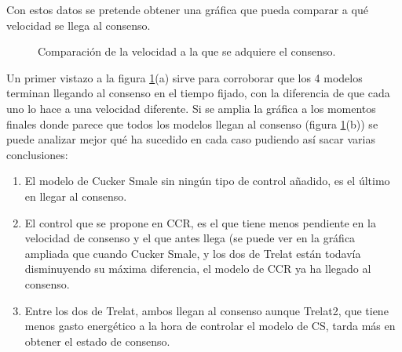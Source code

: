 Con estos datos se pretende obtener una gráfica que pueda comparar a qué velocidad se llega al consenso.

\begin{figure}[htbp]
\centering
\caption{Comparación de la velocidad a la que se adquiere el consenso.} 
\label{fig:consenso_4models}
\end{figure}

Un primer vistazo a la figura \ref{fig:consenso_4models}(a) sirve para corroborar que los 4 modelos terminan llegando al consenso en el tiempo fijado, con la diferencia de que cada uno lo hace a una velocidad diferente. Si se amplia la gráfica a los momentos finales donde parece que todos los modelos llegan al consenso (figura \ref{fig:consenso_4models}(b)) se puede analizar mejor qué ha sucedido en cada caso pudiendo así sacar varias conclusiones:

\begin{enumerate}
    \item El modelo de Cucker Smale sin ningún tipo de control añadido, es el último en llegar al consenso.
    \item El control que se propone en CCR, es el que tiene menos pendiente en la velocidad de consenso y el que antes llega (se puede ver en la gráfica ampliada que cuando Cucker Smale, y los dos de Trelat están todavía disminuyendo su máxima diferencia, el modelo de CCR ya ha llegado al consenso. 
    \item Entre los dos de Trelat, ambos llegan al consenso aunque Trelat2, que tiene menos gasto energético a la hora de controlar el modelo de CS, tarda más en obtener el estado de consenso.
\end{enumerate}

